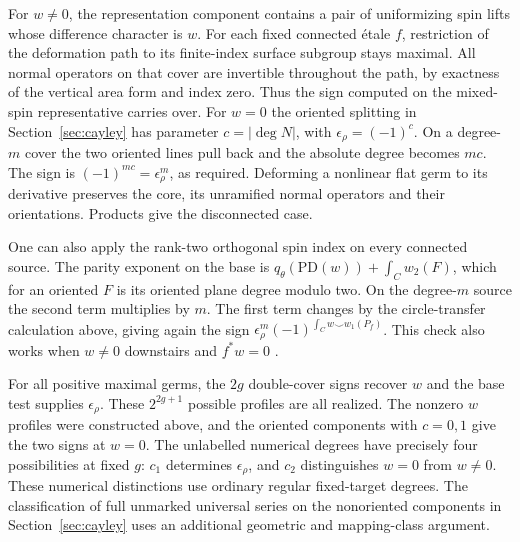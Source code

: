 For \(w\ne0\), the representation component contains a pair of uniformizing spin lifts whose difference character is \(w\). For each fixed connected étale \(f\), restriction of the deformation path to its finite-index surface subgroup stays maximal. All normal operators on that cover are invertible throughout the path, by exactness of the vertical area form and index zero. Thus the sign computed on the mixed-spin representative carries over. For \(w=0\) the oriented splitting in Section~\ref{sec:cayley} has parameter \(c=|\deg N|\), with \(\epsilon_\rho=(-1)^c\). On a degree-\(m\) cover the two oriented lines pull back and the absolute degree becomes \(mc\). The sign is \((-1)^{mc}=\epsilon_\rho^m\), as required. Deforming a nonlinear flat germ to its derivative preserves the core, its unramified normal operators and their orientations. Products give the disconnected case.

One can also apply the rank-two orthogonal spin index on every connected source. The parity exponent on the base is \(q_\theta(\mathrm{PD}(w))+\int_C w_2(F)\), which for an oriented \(F\) is its oriented plane degree modulo two. On the degree-\(m\) source the second term multiplies by \(m\). The first term changes by the circle-transfer calculation above, giving again the sign \(\epsilon_\rho^m(-1)^{\int_C w\smile w_1(P_f)}\). This check also works when \(w\ne0\) downstairs and \(f^*w=0\) \cite{bspectral}.

For all positive maximal germs, the \(2g\) double-cover signs recover \(w\) and the base test supplies \(\epsilon_\rho\). These \(2^{2g+1}\) possible profiles are all realized. The nonzero \(w\) profiles were constructed above, and the oriented components with \(c=0,1\) give the two signs at \(w=0\). The unlabelled numerical degrees have precisely four possibilities at fixed \(g\): \(c_1\) determines \(\epsilon_\rho\), and \(c_2\) distinguishes \(w=0\) from \(w\ne0\). These numerical distinctions use ordinary regular fixed-target degrees. The classification of full unmarked universal series on the nonoriented components in Section~\ref{sec:cayley} uses an additional geometric and mapping-class argument.
